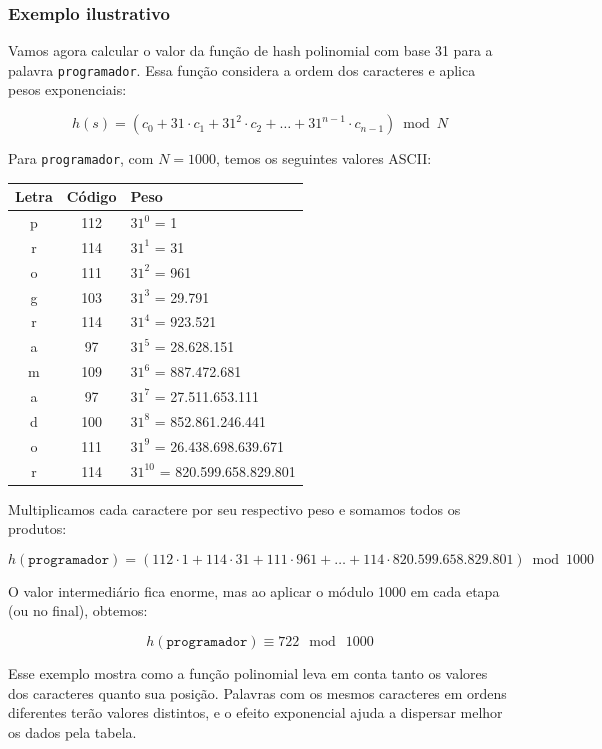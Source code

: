 \begin{example}
\subsubsection*{Exemplo ilustrativo}

Vamos agora calcular o valor da função de hash polinomial com base 31 para a palavra \texttt{programador}. Essa função considera a ordem dos caracteres e aplica pesos exponenciais:

\[
h(s) = (c_0 + 31 \cdot c_1 + 31^2 \cdot c_2 + \dots + 31^{n-1} \cdot c_{n-1}) \bmod N
\]

Para \texttt{programador}, com $N = 1000$, temos os seguintes valores ASCII:

\begin{center}
\begin{tabular}{c|c|l}
Letra & Código & Peso \\
\hline
p & 112 & $31^0$ = 1 \\
r & 114 & $31^1$ = 31 \\
o & 111 & $31^2$ = 961 \\
g & 103 & $31^3$ = 29.791 \\
r & 114 & $31^4$ = 923.521 \\
a & 97 & $31^5$ = 28.628.151 \\
m & 109 & $31^6$ = 887.472.681 \\
a & 97 & $31^7$ = 27.511.653.111 \\
d & 100 & $31^8$ = 852.861.246.441 \\
o & 111 & $31^9$ = 26.438.698.639.671 \\
r & 114 & $31^{10}$ = 820.599.658.829.801 \\
\end{tabular}
\end{center}

Multiplicamos cada caractere por seu respectivo peso e somamos todos os produtos:

\[
h(\texttt{programador}) = (112 \cdot 1 + 114 \cdot 31 + 111 \cdot 961 + \dots + 114 \cdot 820.599.658.829.801) \bmod 1000
\]

O valor intermediário fica enorme, mas ao aplicar o módulo 1000 em cada etapa (ou no final), obtemos:

\[
h(\texttt{programador}) \equiv 722\ \bmod\ 1000
\]

Esse exemplo mostra como a função polinomial leva em conta tanto os valores dos caracteres quanto sua posição. 
Palavras com os mesmos caracteres em ordens diferentes terão valores distintos, e o efeito exponencial ajuda a dispersar melhor os dados pela tabela.


\end{example}

